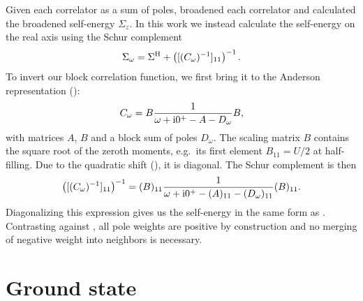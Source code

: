 Given each correlator as a sum of poles, \citeauthor{Kugler2022} \cite{Kugler2022} broadened
each correlator and calculated the broadened self-energy $\Sigma_z$.
In this work we instead calculate the self-energy on the real axis
using the Schur complement \cite{Schur1917}
\begin{equation}
    \Sigma_\omega = \Sigma^{\mathrm{H}} + \left([(C_\omega)^{-1}]_{11}\right)^{-1}.
\end{equation}
To invert our block correlation function, we first bring it to
the Anderson representation ():
\begin{equation}
    C_\omega = B\frac{1}{\omega + \mathrm{i}0^+ - A - D_\omega}B,
\end{equation}
with matrices $A$, $B$ and a block sum of poles $D_\omega$.
The scaling matrix $B$ contains the square root of the zeroth moments,
e.g.\ its first element $B_{11} = U/2$ at half-filling.
Due to the quadratic shift (), it is diagonal.
The Schur complement is then
\begin{equation}
    \left([(C_\omega)^{-1}]_{11}\right)^{-1}
    =
    (B)_{11} \frac{1}{\omega + \mathrm{i}0^+ - (A)_{11} - (D_\omega)_{11}} (B)_{11}.
\end{equation}
Diagonalizing this expression gives us the self-energy in the same form as
.
Contrasting against ,
all pole weights are positive by construction
and no merging of negative weight into neighbors is necessary.

\section{Ground state}


